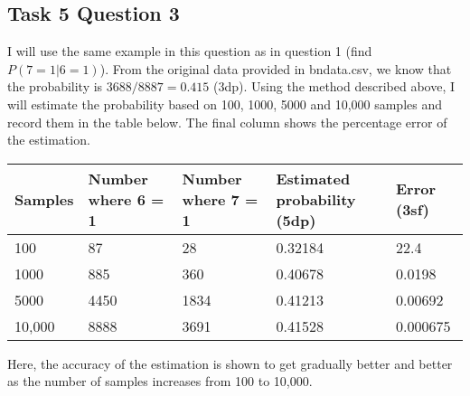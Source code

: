 \documentclass[a4paper,11pt]{article}
\begin{document}

\subsection{Task 5 Question 3}

I will use the same example in this question as in question 1 (find $P(7=1|6=1)$).  From the original data provided in bndata.csv, we know that the probability is $3688 / 8887 = 0.415$ (3dp).  Using the method described above, I will estimate the probability based on 100, 1000, 5000 and 10,000 samples and record them in the table below.  The final column shows the percentage error of the estimation.

\begin{tabular}{l l l l l}
	Samples		& Number where 6 = 1	& Number where 7 = 1	& Estimated probability (5dp)		& Error (3sf) \\
	\hline
	100		& 87	& 28	& 0.32184		& 22.4 \\
	1000	& 885	& 360	& 0.40678		& 0.0198 \\
	5000	& 4450	& 1834	& 0.41213		& 0.00692 \\
	10,000	& 8888	& 3691	& 0.41528		& 0.000675
\end{tabular}

Here, the accuracy of the estimation is shown to get gradually better and better as the number of samples increases from 100 to 10,000.
\end{document}
